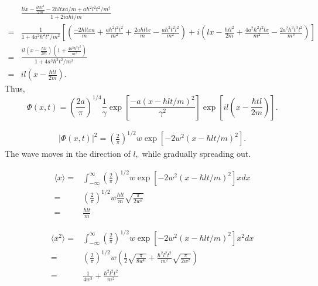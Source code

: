     \begin{align*}
        &\frac{
        lix-\frac{i\hbar tl^2}{2m}
        -2\hbar ltxa/m
        +a\hbar^2l^2t^2/m^2}{1+2ia\hbar t/m}\\
        =&
        \frac{1}{1+4a^2\hbar^2t^2/m^2}
        \left[
        (\frac{-2\hbar ltxa}{m}
        +\frac{a\hbar^2l^2t^2}{m^2}
        +\frac{2a\hbar tlx}{m}
        -\frac{a\hbar^2t^2l^2}{m^2}
        ) + 
        i(lx-\frac{\hbar tl^2}{2m}+
        \frac{4a^2\hbar^2t^2lx}{m^2}
        -\frac{2a^2\hbar^3t^3l^2}{m^3}
        )\right]\\
        =&
        \frac{il(x-
        \frac{\hbar tl}{2m}
        )(1+\frac{4a^2\hbar^2t^2}{m^2})
        }
        {1+4a^2\hbar^2t^2/m^2}\\
        =& il(x-\frac{\hbar tl}{2m}).
    \end{align*}
    Thus,
    $$
    \Phi(x,t)=
    \left(
        \frac{2a}{\pi}
        \right)^{1/4}
        \frac{1}{\gamma}
        \exp{\left[
        \frac{-a(x-\hbar lt/m)^2
       }{\gamma^2}
        \right]}
        \exp\left[
        il(x-\frac{\hbar tl}{2m})
        \right].
    $$

    \begin{align*}
        |\Phi(x,t)|^2=
    \left(
        \frac{2}{\pi}
        \right)^{1/2}
        w
        \exp{\left[
        -2w^2(x-\hbar lt/m)^2
        \right]}
        .
    \end{align*}
    The wave moves in the direction of $l,$ while gradually spreading out.


    \begin{align*}
        \langle
        x
        \rangle
        =&\int_{-\infty}^{\infty}
       \left(
        \frac{2}{\pi}
        \right)^{1/2}
        w
        \exp{\left[
        -2w^2(x-\hbar lt/m)^2
        \right]}xdx\\
        =& \left(
        \frac{2}{\pi}
        \right)^{1/2}
        w
        \frac{\hbar lt}{m}
        \sqrt{\frac{\pi}{2w^2}}\\
        =&\frac{\hbar lt}{m}
    \end{align*}

     \begin{align*}
        \langle
        x^2
        \rangle
        =&\int_{-\infty}^{\infty}
       \left(
        \frac{2}{\pi}
        \right)^{1/2}
        w
        \exp{\left[
        -2w^2(x-\hbar lt/m)^2
        \right]}x^2dx\\
        =& \left(
        \frac{2}{\pi}
        \right)^{1/2}
        w
        \left(
        \frac{1}{2}
        \sqrt{\frac{\pi}{8w^6}}
        +
        \frac{\hbar^2 l^2t^2}{m^2}
        \sqrt{\frac{\pi}{2w^2}}
        \right)
        \\
        =&
        \frac{1}{4w^2}
        +
        \frac{\hbar^2 l^2t^2}{m^2}
    \end{align*}

